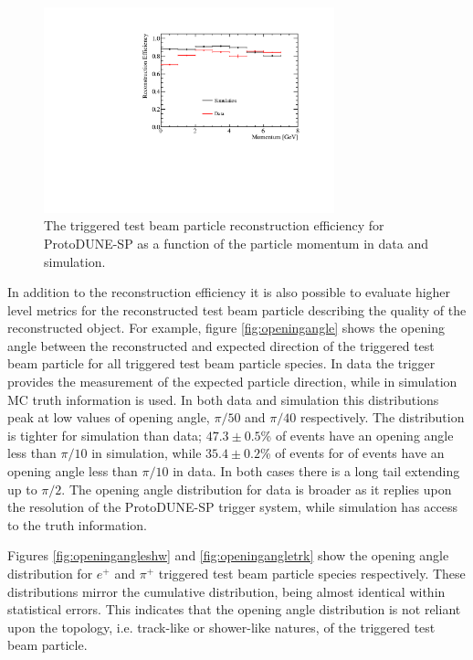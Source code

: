 \begin{figure}
\centering
\includegraphics[width=0.75\textwidth]{Figures/Metrics/Data/Beam/BeamParticleEfficiencyVsMomentum.pdf}
\caption{The triggered test beam particle reconstruction efficiency for ProtoDUNE-SP as a function of the particle momentum in data and simulation.}
\label{fig:datamcrecoeff}
\end{figure}

In addition to the reconstruction efficiency it is also possible to evaluate higher level metrics for the reconstructed test beam particle describing the quality of the reconstructed object.  For example, figure \ref{fig:openingangle} shows the opening angle between the reconstructed and expected direction of the triggered test beam particle for all triggered test beam particle species.  In data the trigger provides the measurement of the expected particle direction, while in simulation MC truth information is used.  In both data and simulation this distributions peak at low values of opening angle, $\pi/50$ and $\pi/40$ respectively.  The distribution is tighter for simulation than data; $47.3\pm0.5$\% of events have an opening angle less than $\pi/10$ in simulation, while $35.4\pm0.2$\% of events for of events have an opening angle less than $\pi/10$ in data.  In both cases there is a long tail extending up to $\pi/2$.  The opening angle distribution for data is broader as it replies upon the resolution of the ProtoDUNE-SP trigger system, while simulation has access to the truth information.  

Figures \ref{fig:openingangleshw} and \ref{fig:openingangletrk} show the opening angle distribution for $e^{+}$ and $\pi^{+}$ triggered test beam particle species respectively.  These distributions mirror the cumulative distribution, being almost identical within statistical errors.  This indicates that the opening angle distribution is not reliant upon the topology, i.e. track-like or shower-like natures, of the triggered test beam particle.

